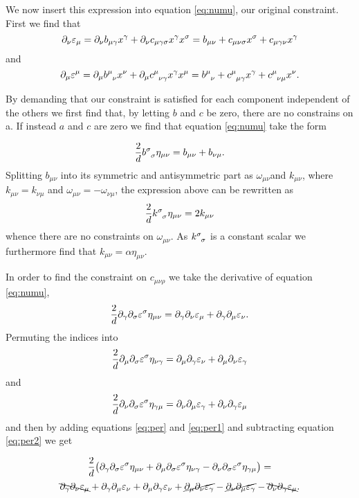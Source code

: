 We now insert this expression into equation \ref{eq:numu}, our original constraint. First we find that
  $$
  \partial_\nu \varepsilon_\mu=\partial_\nu b_{\mu \gamma}x^\gamma+\partial_\nu c_{\mu \gamma \sigma} x^\gamma x^\sigma=b_{\mu \nu}+ c_{\mu \nu \sigma}x^\sigma+c_{\mu \gamma \nu}x^\gamma
  $$
 and
$$ \p_\mu \ep^\mu= \p_\mu b\ein{\mu}{\nu}x^\nu +\p_\mu c\ein{\mu}{\nu \gamma}x^\gamma x^\mu= \\ b\ein{\mu}{\nu}+c\ein{\mu}{\mu \gamma} x^\gamma+c\ein{\mu}{\nu \mu} x^\nu.
$$

By demanding that our constraint is satisfied for each component independent of the others we first find that,
by letting $b$ and $c$ be zero, there are no constrains on a. If instead $a$ and $c$ are zero we find that equation \ref{eq:numu} take the form

\[
\frac{2}{d}  b\ein {\sigma}{\sigma} \eta_{\mu \nu}=b_{\mu \nu}+b_{\nu \mu}.
\]
Splitting $b_{\mu\nu}$ into its symmetric and antisymmetric part as $\omega_{\mu \nu}$and $k_{\mu \nu}$, where $k_{\mu \nu}=k_{\nu \mu}$  and $\omega_{\mu \nu}=-\omega_{\nu \mu}$, the expression above can be rewritten as
$$
\frac{2}{d}  k\ein {\sigma}{\sigma} \eta_{\mu \nu}=2k_{\mu \nu}
$$
whence there are no constraints on $\omega_{\mu\nu}$. As $k\ein{\sigma}{\sigma}$ is a constant scalar we furthermore find that $k_{\mu\nu}=\alpha\eta_{\mu\nu}$.

In order to find the constraint on $c_{\mu\nu\rho}$ we take the derivative of equation \ref{eq:numu},
\begin{equation}
\frac{2}{d} \partial_\gamma \partial_\sigma \varepsilon^\sigma \eta_{\mu \nu}
=\partial_\gamma \partial_\nu \varepsilon_\mu
+ \partial_\gamma \partial_\mu \varepsilon_\nu.
\label{eq:per}
\end{equation}
 Permuting the indices into
 \begin{equation}
\frac{2}{d} \partial_\mu \partial_\sigma \varepsilon^\sigma \eta_{\nu \gamma}=\partial_\mu \partial_\gamma \varepsilon_\nu+ \partial_\mu \partial_\nu \varepsilon_\gamma
\label{eq:per1}
\end{equation}
and
\begin{equation}
\frac{2}{d} \partial_\nu \partial_\sigma \varepsilon^\sigma \eta_{\gamma \mu}=\partial_\nu \partial_\mu \varepsilon_\gamma+ \partial_\nu \partial_\gamma \varepsilon_\mu
\label{eq:per2}
\end{equation}
and then by adding equations \ref{eq:per} and \ref{eq:per1} and subtracting equation \ref{eq:per2} we get
 
 $$
\frac{2}{d}\big(\partial_\gamma \partial_\sigma \varepsilon^\sigma \eta_{\mu \nu}
+\partial_\mu \partial_\sigma \varepsilon^\sigma \eta_{\nu \gamma}
-\partial_\nu \partial_\sigma \varepsilon^\sigma \eta_{\gamma \mu}  \big)= 
$$$$
\bcancel{\partial_\gamma \partial_\nu \varepsilon_\mu}
+ \partial_\gamma \partial_\mu \varepsilon_\nu
+ \partial_\mu \partial_\gamma \varepsilon_\nu
+ \cancel{\partial_\mu \partial_\nu \varepsilon_\gamma}
-\cancel{\partial_\nu \partial_\mu \varepsilon_\gamma}
- \bcancel{\partial_\nu \partial_\gamma \varepsilon_\mu}.
$$

